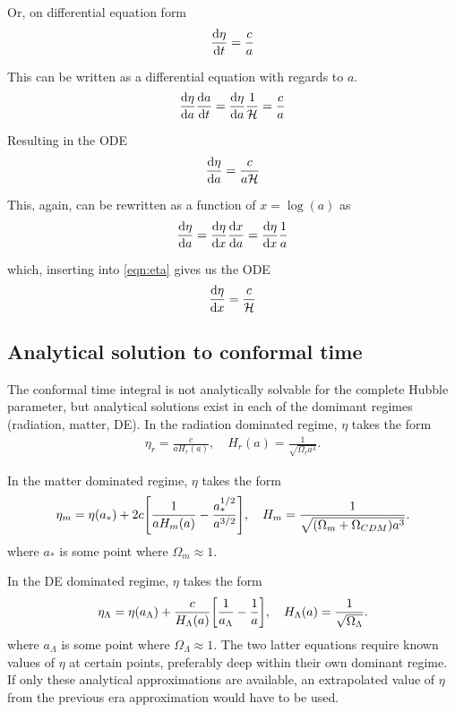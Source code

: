 \documentclass[10pt, a4paper]{article}
\begin{document}
Or, on differential equation form
\begin{equation}
    \dv{\eta}{t} = \frac{c}{a}
\end{equation}

This can be written as a differential equation with regards to $a$.
\begin{equation*}
    \dv{\eta}{a}\dv{a}{t} = \dv{\eta}{a}\frac{1}{\mathcal{H}} = \frac{c}{a}
\end{equation*}

Resulting in the ODE
\begin{align}\label{eqn:eta}
    \dv{\eta}{a} = \frac{c}{a\mathcal{H}}
\end{align}

This, again, can be rewritten as a function of $x = \log(a)$ as
\begin{align*}
    \dv{\eta}{a} = \dv{\eta}{x}\dv{x}{a} = \dv{\eta}{x}\frac{1}{a}
\end{align*}

which, inserting into \ref{eqn:eta} gives us the ODE
\begin{align}\label{eqn:etaODE}
    \dv{\eta}{x} = \frac{c}{\mathcal{H}}
\end{align}


\subsection{Analytical solution to conformal time}\label{sec:conf}
The conformal time integral is not analytically solvable for the complete Hubble parameter, but analytical solutions exist in each of the domimant regimes (radiation, matter, DE). In the radiation dominated regime, $\eta$ takes the form
\begin{align}
    \eta_r = \frac{c}{aH_r(a)},  \quad  H_r(a) = \frac{1}{\sqrt{\Omega_r a^{4}}}.
\end{align}

In the matter dominated regime, $\eta$ takes the form
\begin{align}
    \eta_m = \eta(a_*) + 2c\qty[\frac{1}{aH_m(a)} - \frac{a_*^{1/2}}{a^{3/2}}], \quad H_m = \frac{1}{\sqrt{(\Omega_m + \Omega_{CDM}) a^3}}.
\end{align}
where $a_*$ is some point where $\Omega_m \approx 1$.

In the DE dominated regime, $\eta$ takes the form
\begin{align}
    \eta_\Lambda = \eta(a_\Lambda) + \frac{c}{H_\Lambda(a)}\qty[\frac{1}{a_\Lambda} - \frac{1}{a}], \quad H_\Lambda(a) = \frac{1}{\sqrt{\Omega_\Lambda}}.
\end{align}
where $a_\Lambda$ is some point where $\Omega_\Lambda \approx 1$. The two latter equations require known values of $\eta$ at certain points, preferably deep within their own dominant regime. If only these analytical approximations are available, an extrapolated value of $\eta$ from the previous era approximation would have to be used.
\end{document}
